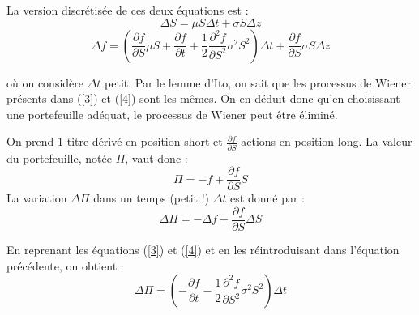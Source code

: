 La version discrétisée de ces deux équations est : 
	\begin{equation}\label{3} \Delta S=\mu S \Delta t + \sigma S \Delta z\end{equation}
\begin{equation} \label{4} \Delta f=\left(\frac{\partial f}{\partial S} \mu S + \frac{\partial f}{\partial t} + \frac{1}{2}\frac{\partial^2 f}{\partial S^2} \sigma^2S^2\right)\Delta t + \frac{\partial f}{\partial S} \sigma S \Delta z\end{equation}

où on considère $\Delta t$ petit. Par le lemme d'Ito, on sait que les processus de Wiener présents dans (\ref{3}) et (\ref{4}) sont les mêmes. On en déduit donc qu'en choisissant une portefeuille adéquat, le processus de Wiener peut être éliminé. 

\bigskip
On prend $1$ titre dérivé en position short et $\frac{\partial f}{\partial S}$ actions en position long. La valeur du portefeuille, notée $\Pi$, vaut donc : 
\[\Pi=-f+\frac{\partial f}{\partial S} S\]
La variation $\Delta \Pi$ dans un temps (petit !) $\Delta t$ est donné par : 
\[\Delta\Pi = -\Delta f+\frac{\partial f}{\partial S} \Delta S\]

En reprenant les équations (\ref{3}) et (\ref{4}) et en les réintroduisant dans l'équation précédente, on obtient : 
\begin{equation} \label{5} \Delta\Pi = \left( -\frac{\partial f}{\partial t} - \frac{1}{2} \frac{\partial^2 f}{\partial S^2}\sigma^2S^2 \right) \Delta t\end{equation}

